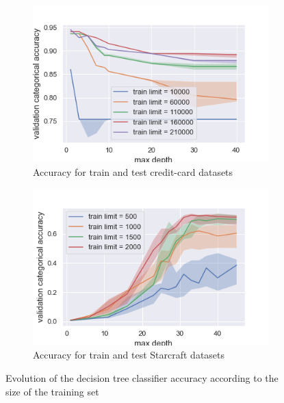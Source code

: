 \documentclass[twocolumn, a4paper, 10pt]{article}
\begin{document}
		\begin{figure}[]
			\centering
			\begin{subfigure}[]{0.8\columnwidth}
				\centering
				\includegraphics[width=\linewidth]{../graphics/tree_creditcard_max_depth_score_type_train_limit.png}
				\caption{Accuracy for train and test credit-card datasets}
				\label{tree:cc_train_size_score_type_score_type}
			\end{subfigure}
			\begin{subfigure}[]{0.8\columnwidth}
				\centering
				\includegraphics[width=\linewidth]{../graphics/tree_starcraft_max_depth_score_type_train_limit.png}
				\caption{Accuracy for train and test Starcraft datasets}
				\label{tree:sc_train_size_score_type_score_type}
			\end{subfigure}
			\caption{Evolution of the decision tree classifier accuracy according to the size of the training set}
			\label{tree:train_size_score_type_score_type}
		\end{figure}
\end{document}
